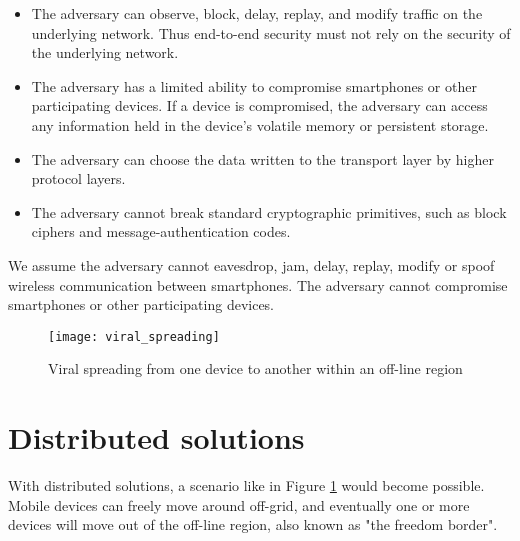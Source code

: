 \begin{itemize}
\item{
	The adversary can observe, block, delay, replay, and modify traffic on the underlying network.
	Thus end-to-end security must not rely on the security of the underlying network.
}
\item{
	The adversary has a limited ability to compromise smartphones or other participating devices.
	If a device is compromised, the adversary can access any information held in the device's volatile memory or persistent storage.
}
\item{
	The adversary can choose the data written to the transport layer by higher protocol layers.
}
\item{
	The adversary cannot break standard cryptographic primitives, such as block ciphers and message-authentication codes.
}
\end{itemize}
We assume the adversary cannot eavesdrop, jam, delay, replay, modify or spoof wireless communication between smartphones.
The adversary cannot compromise smartphones or other participating devices.

\begin{figure}[H]
	\centering
	\texttt{[image: viral\_spreading]}
	\caption{Viral spreading from one device to another within an off-line region}
	\label{fig:viral_spreading}
\end{figure}

\section{Distributed solutions}\label{sec:distributed_solutions}
With distributed solutions, a scenario like in Figure \ref{fig:viral_spreading} would become possible.
Mobile devices can freely move around off-grid, and eventually one or more devices will move out of the off-line region, also known as "the freedom border".

